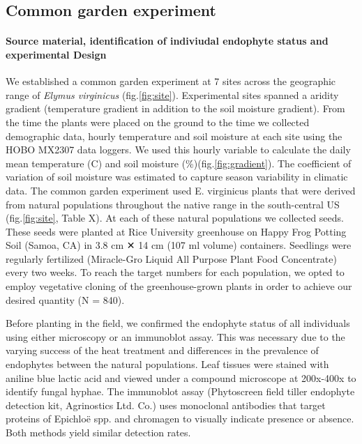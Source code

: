 \documentclass[11pt]{article}
\begin{document}
\subsection*{Common garden experiment}
\paragraph {Source material, identification of indiviudal endophyte status and experimental Design} 
We established a common garden experiment at 7 sites across the geographic range of \emph {Elymus virginicus} (fig.\ref{fig:site}). 
Experimental sites spanned a aridity gradient (temperature gradient in addition to the soil moisture gradient).
From the time the plants were placed on the ground to the time we collected demographic data, hourly temperature and soil moisture at each site using the HOBO MX2307 data loggers. 
We used this hourly variable to calculate the daily mean temperature (\degree C) and soil moisture (\%)(fig.\ref{fig:gradient}). 
The coefficient of variation of soil moisture was estimated to capture season variability in climatic data. 
The common garden experiment used E. virginicus plants that were derived from natural populations throughout the native range in the south-central US (fig.\ref{fig:site}, Table X). 
At each of these natural populations we collected seeds. 
These seeds were planted at Rice University greenhouse on Happy Frog Potting Soil (Samoa, CA) in 3.8 cm ✕ 14 cm (107 ml volume) containers.
Seedlings were regularly fertilized (Miracle-Gro Liquid All Purpose Plant Food Concentrate) every two weeks. 
To reach the target numbers for each population, we opted to employ vegetative cloning of the greenhouse-grown plants in order to achieve our desired quantity (N = 840).

Before planting in the field, we confirmed the endophyte status of all individuals using either microscopy or an immunoblot assay. This was necessary due to the varying success of the heat treatment and differences in the prevalence of endophytes between the natural populations. Leaf tissues were stained with aniline blue lactic acid and viewed under a compound microscope at 200x-400x to identify fungal hyphae. The immunoblot assay (Phytoscreen field tiller endophyte detection kit, Agrinostics Ltd. Co.) uses monoclonal antibodies that target proteins of Epichloë spp. and chromagen to visually indicate presence or absence. Both methods yield similar detection rates.  
\end{document}
